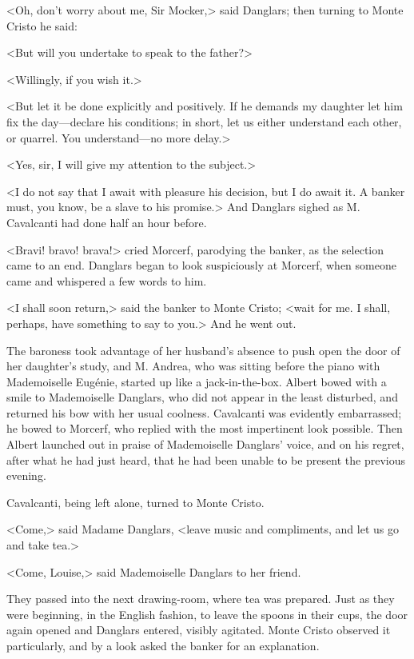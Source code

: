  <Oh, don't worry about me, Sir Mocker,> said Danglars; then turning to Monte Cristo he said: 

 <But will you undertake to speak to the father?> 

 <Willingly, if you wish it.> 

 <But let it be done explicitly and positively. If he demands my daughter let him fix the day—declare his conditions; in short, let us either understand each other, or quarrel. You understand—no more delay.> 

 <Yes, sir, I will give my attention to the subject.> 

 <I do not say that I await with pleasure his decision, but I do await it. A banker must, you know, be a slave to his promise.> And Danglars sighed as M. Cavalcanti had done half an hour before. 

 <Bravi! bravo! brava!> cried Morcerf, parodying the banker, as the selection came to an end. Danglars began to look suspiciously at Morcerf, when someone came and whispered a few words to him. 

 <I shall soon return,> said the banker to Monte Cristo; <wait for me. I shall, perhaps, have something to say to you.> And he went out. 

 The baroness took advantage of her husband's absence to push open the door of her daughter's study, and M. Andrea, who was sitting before the piano with Mademoiselle Eugénie, started up like a jack-in-the-box. Albert bowed with a smile to Mademoiselle Danglars, who did not appear in the least disturbed, and returned his bow with her usual coolness. Cavalcanti was evidently embarrassed; he bowed to Morcerf, who replied with the most impertinent look possible. Then Albert launched out in praise of Mademoiselle Danglars' voice, and on his regret, after what he had just heard, that he had been unable to be present the previous evening. 

 Cavalcanti, being left alone, turned to Monte Cristo. 

 <Come,> said Madame Danglars, <leave music and compliments, and let us go and take tea.> 

 <Come, Louise,> said Mademoiselle Danglars to her friend. 

 They passed into the next drawing-room, where tea was prepared. Just as they were beginning, in the English fashion, to leave the spoons in their cups, the door again opened and Danglars entered, visibly agitated. Monte Cristo observed it particularly, and by a look asked the banker for an explanation. 

